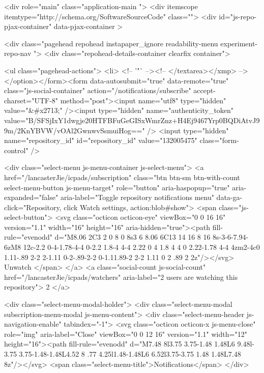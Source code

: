   <div role="main" class="application-main ">
        <div itemscope itemtype="http://schema.org/SoftwareSourceCode" class="">
    <div id="js-repo-pjax-container" data-pjax-container >
      







  <div class="pagehead repohead instapaper_ignore readability-menu experiment-repo-nav  ">
    <div class="repohead-details-container clearfix container">

      <ul class="pagehead-actions">
  <li>
        <!-- '"` --><!-- </textarea></xmp> --></option></form><form data-autosubmit="true" data-remote="true" class="js-social-container" action="/notifications/subscribe" accept-charset="UTF-8" method="post"><input name="utf8" type="hidden" value="&#x2713;" /><input type="hidden" name="authenticity_token" value="B/SFSjIxY1dwgje20HTFBFuGeGISxWmrZnz+H4Ej9467Yrp0BQDiAtvJ99m/2KnYBVW/vOAl2GwnwvSsmuiHog==" />      <input type="hidden" name="repository_id" id="repository_id" value="132005475" class="form-control" />

        <div class="select-menu js-menu-container js-select-menu">
          <a href="/lancasterJie/icpads/subscription"
            class="btn btn-sm btn-with-count select-menu-button js-menu-target"
            role="button"
            aria-haspopup="true"
            aria-expanded="false"
            aria-label="Toggle repository notifications menu"
            data-ga-click="Repository, click Watch settings, action:blob#show">
            <span class="js-select-button">
                <svg class="octicon octicon-eye" viewBox="0 0 16 16" version="1.1" width="16" height="16" aria-hidden="true"><path fill-rule="evenodd" d="M8.06 2C3 2 0 8 0 8s3 6 8.06 6C13 14 16 8 16 8s-3-6-7.94-6zM8 12c-2.2 0-4-1.78-4-4 0-2.2 1.8-4 4-4 2.22 0 4 1.8 4 4 0 2.22-1.78 4-4 4zm2-4c0 1.11-.89 2-2 2-1.11 0-2-.89-2-2 0-1.11.89-2 2-2 1.11 0 2 .89 2 2z"/></svg>
                Unwatch
            </span>
          </a>
          <a class="social-count js-social-count"
            href="/lancasterJie/icpads/watchers"
            aria-label="2 users are watching this repository">
            2
          </a>

        <div class="select-menu-modal-holder">
          <div class="select-menu-modal subscription-menu-modal js-menu-content">
            <div class="select-menu-header js-navigation-enable" tabindex="-1">
              <svg class="octicon octicon-x js-menu-close" role="img" aria-label="Close" viewBox="0 0 12 16" version="1.1" width="12" height="16"><path fill-rule="evenodd" d="M7.48 8l3.75 3.75-1.48 1.48L6 9.48l-3.75 3.75-1.48-1.48L4.52 8 .77 4.25l1.48-1.48L6 6.52l3.75-3.75 1.48 1.48L7.48 8z"/></svg>
              <span class="select-menu-title">Notifications</span>
            </div>

